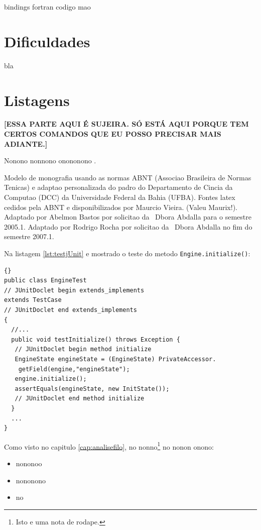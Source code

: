 bindings fortran codigo mao

\section{Dificuldades} \label{sec:dificuldades}

bla



\section{Listagens} \label{sec:listagens}

\textbf{[ESSA PARTE AQUI É SUJEIRA. SÓ ESTÁ AQUI PORQUE TEM CERTOS COMANDOS QUE EU POSSO PRECISAR MAIS ADIANTE.]}

Nonono nonnono onononono \cite{fowler2000}.

Modelo de monografia usando as normas ABNT (Associao Brasileira de Normas
Tenicas) 
e adaptao personalizada 
do padro do Departamento de Cincia da Computao (DCC) da Universidade
Federal da Bahia (UFBA).
Fontes latex cedidos pela ABNT e disponibilizados por 
Maurcio Vieira. (Valeu Maurix!). Adaptado por Abelmon Bastos por solicitao
da \profa\ Dbora Abdalla para o semestre 2005.1.
Adaptado por Rodrigo Rocha por solicitao da \profa\ Dbora Abdalla no fim
do semestre 2007.1.

Na listagem \ref{lst:testjUnit} 
e mostrado o teste do metodo \texttt{Engine.initialize()}:

\lstset{language=java}
\lstset{commentstyle=\textit}
\begin{lstlisting}[frame=trbl, caption=Classe Factory2D,label=lst:testjUnit]{}
public class EngineTest
// JUnitDoclet begin extends_implements
extends TestCase
// JUnitDoclet end extends_implements
{
  //...
  public void testInitialize() throws Exception {
   // JUnitDoclet begin method initialize
   EngineState engineState = (EngineState) PrivateAccessor.
    getField(engine,"engineState");
   engine.initialize();
   assertEquals(engineState, new InitState());
   // JUnitDoclet end method initialize
  }
  ...
}
\end{lstlisting}

Como visto no capitulo \ref{cap:analisefilo}, no nonno\footnote{Isto e uma nota
de rodape.} no nonon onono:
\begin{itemize}
  \item{nononoo}
  \item{nononono}
  \item{no}
\end{itemize}


